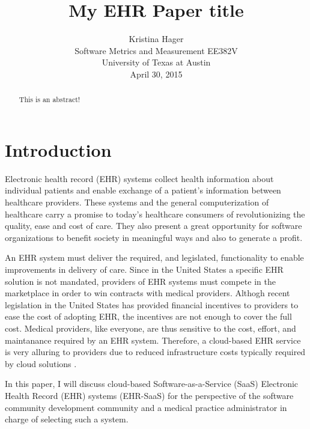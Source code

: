 \documentclass[10pt]{article}
\begin{document}
\title{My EHR Paper title}

\author{Kristina Hager\\
Software Metrics and Measurement EE382V\\
University of Texas at Austin\\
April 30, 2015\\
}

\maketitle
\thispagestyle{empty}

\begin{abstract}
	This is an abstract!
\end{abstract}


\section{Introduction}
\label{Introduction}

Electronic health record (EHR) systems collect health information about individual patients 
and enable exchange of a patient's information between healthcare providers.
These systems and the general computerization of healthcare carry a promise to today's healthcare consumers
of revolutionizing the quality, ease and cost of care.
They also present a great opportunity for software organizations to benefit society in meaningful ways
and also to generate a profit.

An EHR system must deliver the required, and legislated, functionality to enable improvements in delivery of care.
Since in the United States a specific EHR solution is not mandated, providers of EHR systems must compete in the marketplace
in order to win contracts with medical providers.
Althogh recent legislation in the United States has provided financial incentives to providers to ease the cost of adopting EHR,
the incentives are not enough to cover the full cost.
Medical providers, like everyone, are thus sensitive to the cost, effort, and maintanance required by an EHR system.
Therefore, a cloud-based EHR service is very alluring to providers due to reduced infrastructure costs typically required by cloud solutions \cite{auditingprivacy}.

In this paper, I will discuss cloud-based Software-as-a-Service (SaaS) Electronic Health Record (EHR) systems (EHR-SaaS) for the perspective
of the software community development community and a medical practice administrator in charge of selecting such a system.
\end{document}
